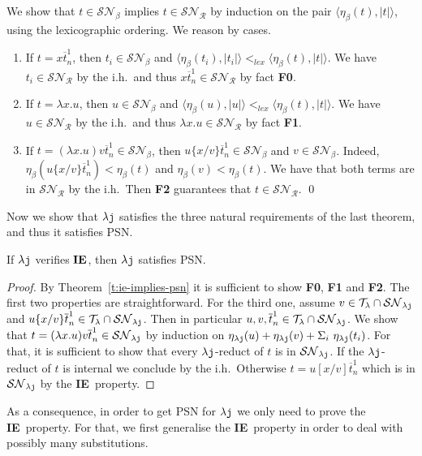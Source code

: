 \documentclass{LMCS}
\renewcommand{\>}{\rightarrow}
\def\lam{\lambda}
\newcommand{\isubs}[1]{ \{ #1  \} }
\newcommand{\SN}[1]{\mathcal{SN}_{#1}}
\newcommand{\R}{\mathcal{R}}
\newcommand{\dis}{{\tt j}}
\newcommand{\ldis}{\lam{\dis}}
\newcommand{\lj}{\lam{\dis}}
\newcommand{\pair}[2]{\langle #1, #2 \rangle}
\newcommand{\ih}{i.h.}
\newcommand{\terms}{\mathcal{T}}
\newcommand{\termslambda}{\terms_{\lam}}
\newcommand{\iep}{{\bf IE}}
\newcommand{\ovl}[3]{\overline{#1}^{#2}_{#3}}
\begin{document}
\proof
We show that $t\in \SN{\beta}$ implies $t \in \SN{\R}$ by induction on
the pair $\pair{\eta_{\beta}(t)}{|t|}$, using the lexicographic
ordering. We reason by cases.
\begin{enumerate}[$\bullet$]
\item If $t = x\ovl{t}{1}{n}$, then  $t_i \in \SN{\beta}$
and $\pair{\eta_{\beta}(t_i)}{|t_i|} <_{lex} \pair{\eta_{\beta}(t)}{|t|}$. We have 
$t_i \in \SN{\R}$ by the  \ih\ and thus  $x\ovl{t}{1}{n} \in \SN{\R}$ by fact {\bf F0}.
\item If $t =  \lam x.u$, then  $u  \in \SN{\beta}$
and $\pair{\eta_{\beta}(u)}{|u|} <_{lex} \pair{\eta_{\beta}(t)}{|t|}$. 
We have 
$u  \in \SN{\R}$ by the  \ih\ and thus  $\lam x. u \in \SN{\R}$ by fact {\bf F1}.
\item If $t = (\lam x.  u) v\ovl{t}{1}{n}\in \SN{\beta}$, 
then $u\isubs{x/v} \ovl{t}{1}{n} \in \SN{\beta}$ and $v \in \SN{\beta}$. 
Indeed, $\eta_{\beta}(u\isubs{x/v}\ovl{t}{1}{n})  < \eta_{\beta}(t)$
and  $\eta_{\beta}(v) < \eta_{\beta}(t)$. 
We have that 
both terms are in $\SN{\R}$ by  the  \ih\
Then {\bf F2} guarantees that $t \in \SN{\R}$.
\qed
\end{enumerate}
Now we show that 
$\lj$  satisfies the three natural requirements of the last
theorem, and thus it satisfies PSN.

\begin{lem}[Adequacy of $\iep$] 
\label{l:adequacy}
If $\ldis$ verifies $\iep$, then $\ldis$ satisfies PSN.
\end{lem}

\begin{proof} By Theorem~\ref{t:ie-implies-psn} it is sufficient to
show {\bf F0}, {\bf F1} and {\bf F2}.  The first two properties are
  straightforward.  For the third one,  assume $v \in \termslambda \cap \SN{\ldis}$
  and $u\isubs{x/v}\ovl{t}{1}{n} \in \termslambda \cap \SN{\ldis}$.
  Then in particular $u, v, \ovl{t}{1}{n}\in \termslambda \cap
  \SN{\ldis}$. We show that $t = (\lam x.  u) v \ovl{t}{1}{n} \in
  \SN{\ldis}$ by induction on $\eta_{\ldis}(u) + \eta_{\ldis}(v) +
  \Sigma_{i}\ \eta_{\ldis}(t_i)$.  For that, it is sufficient to show
  that every $\ldis$-reduct of $t$ is in $\SN{\ldis}$.  If the
  $\ldis$-reduct of $t$ is internal we conclude by the \ih\ Otherwise
  $t = u[x/v] \ovl{t}{1}{n}$ which is in $\SN{\ldis}$ by the
  \iep\ property.
\end{proof}



As a consequence, in order to get PSN for $\lj$ we only need to prove 
the \iep\ property. For that, we first generalise
the \iep\ property in order to deal with  possibly many
substitutions.   
\end{document}
